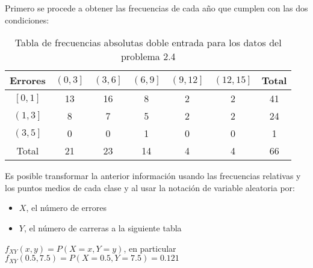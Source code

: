 Primero se procede a obtener las frecuencias de cada año que cumplen con las dos condiciones:
\begin{table}[h!]
    \centering
    \begin{tabular}{|c|c|c|c|c|c|c|}
        \hline
        Errores             & $\left( 0,3\right]$ & $\left( 3,6\right]$ & $\left( 6,9\right]$ & $\left( 9,12\right]$ & $\left( 12,15\right]$ & Total \\ \hline
        $\left[ 0,1\right]$ & 13                  & 16                  & 8                   & 2                    & 2                     & 41    \\ \hline
        $\left( 1,3\right]$ & 8                   & 7                   & 5                   & 2                    & 2                     & 24    \\ \hline
        $\left( 3,5\right]$ & 0                   & 0                   & 1                   & 0                    & 0                     & 1     \\ \hline
        Total               & 21                  & 23                  & 14                  & 4                    & 4                     & 66    \\ \hline
    \end{tabular}
    \caption{Tabla de frecuencias absolutas doble entrada para los datos del problema 2.4}
    \label{tabme6}
\end{table}


Es posible transformar la anterior información usando las frecuencias relativas y los puntos medios de cada clase y al usar la notación de variable aleatoria por:
\begin{itemize}
    \item $X$, el número de errores
    \item $Y$, el número de carreras a la siguiente tabla
\end{itemize}

$f_{XY}\left( x,y\right)=P\left( X=x,Y=y\right)$, en particular
$f_{XY}\left( 0.5,7.5\right) =P\left( X=0.5,Y=7.5\right) =0.121$

